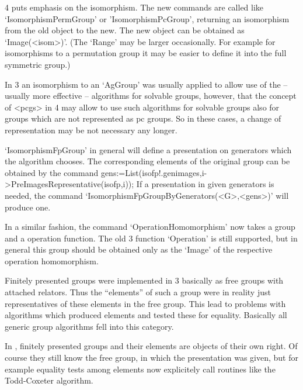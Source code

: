 {\GAP}4 puts emphasis on the isomorphism. The new commands are called
like `IsomorphismPermGroup' or 'IsomorphismPcGroup', returning an
isomorphism from the old object to the new.
The new object can be obtained as `Image(<isom>)'. (The `Range' may
be larger occasionally. For example for isomorphisms to a permutation group
it may be easier to define it into the full symmetric group.)

In {\GAP}3 an isomorphism to an `AgGroup' was usually applied to allow use of
the -- usually more effective -- algorithms for solvable groups, however,
that the concept of <pcgs> in {\GAP}4 may allow to use such algorithms for
solvable groups also for groups which are not represented as pc groups.
So in these cases, a change of representation may be not necessary any
longer.

`IsomorphismFpGroup' in general will define a presentation on generators
which the algorithm chooses. The corresponding elements of the original
group can be obtained by the command
\begintt
gens:=List(isofp!.genimages,i->PreImagesRepresentative(isofp,i));
\endtt
If a presentation in given generators is needed, the command
`IsomorphismFpGroupByGenerators(<G>,<gens>)' will produce one.

In a similar fashion, the command `OperationHomomorphism' now takes a group
and a
operation function. The old {\GAP}3 function `Operation' is still supported,
but in general this group should be obtained only as the `Image' of the
respective operation homomorphism.


Finitely presented groups were implemented in {\GAP}3 basically as free
groups with attached relators. Thus the ``elements'' of such a group were in
reality just representatives of these elements in the free group.
This lead to problems with algorithms which produced elements and tested
these for equality. Basically all generic group algorithms fell into this
category.

In {}, finitely presented groups and their elements are
objects of their own right. Of course they still know the free group, in
which the presentation was given, but for example equality tests among
elements now explicitely call routines like the Todd-Coxeter algorithm.  


